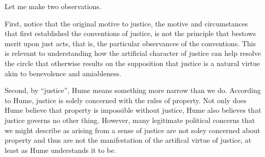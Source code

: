 Let me make two observations.

First, notice that the original motive to justice, the motive and circumstances that first established the conventions of justice, is not the principle that bestows merit upon just acts, that is, the particular observances of the conventions. This is relevant to understanding how the artificial character of justice can help resolve the circle that otherwise results on the supposition that justice is a natural virtue akin to benevolence and amiableness.

Second, by ``justice'', Hume means something more narrow than we do. According to Hume, justice is solely concerned with the rules of property. Not only does Hume believe that property is impossible without justice, Hume also believes that justice governs no other thing. However, many legitimate political concerns that we might describe as arising from a sense of justice are not soley concerned about property and thus are not the manifestation of the artifical virtue of justice, at least as Hume understands it to be.

% 


